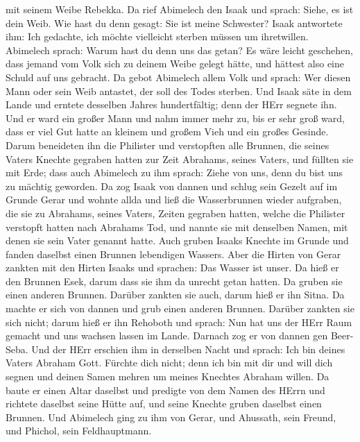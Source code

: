mit seinem Weibe Rebekka.  Da rief Abimelech den Isaak und
sprach: Siehe, es ist dein Weib. Wie hast du denn gesagt: Sie ist meine
Schwester? Isaak antwortete ihm: Ich gedachte, ich möchte vielleicht
sterben müssen um ihretwillen.  Abimelech sprach: Warum
hast du denn uns das getan? Es wäre leicht geschehen, dass jemand vom
Volk sich zu deinem Weibe gelegt hätte, und hättest also eine Schuld auf
uns gebracht.  Da gebot Abimelech allem Volk und sprach:
Wer diesen Mann oder sein Weib antastet, der soll des Todes sterben.
 Und Isaak säte in dem Lande und erntete desselben Jahres
hundertfältig; denn der HErr segnete ihn.  Und er ward ein
großer Mann und nahm immer mehr zu, bis er sehr groß ward, 
dass er viel Gut hatte an kleinem und großem Vieh und ein großes
Gesinde. Darum beneideten ihn die Philister  und
verstopften alle Brunnen, die seines Vaters Knechte gegraben hatten zur
Zeit Abrahams, seines Vaters, und füllten sie mit Erde; 
dass auch Abimelech zu ihm sprach: Ziehe von uns, denn du bist uns zu
mächtig geworden.  Da zog Isaak von dannen und schlug sein
Gezelt auf im Grunde Gerar und wohnte allda  und ließ die
Wasserbrunnen wieder aufgraben, die sie zu Abrahams, seines Vaters,
Zeiten gegraben hatten, welche die Philister verstopft hatten nach
Abrahams Tod, und nannte sie mit denselben Namen, mit denen sie sein
Vater genannt hatte.  Auch gruben Isaaks Knechte im Grunde
und fanden daselbst einen Brunnen lebendigen Wassers.  Aber
die Hirten von Gerar zankten mit den Hirten Isaaks und sprachen: Das
Wasser ist unser. Da hieß er den Brunnen Esek, darum dass sie ihm da
unrecht getan hatten.  Da gruben sie einen anderen Brunnen.
Darüber zankten sie auch, darum hieß er ihn Sitna.  Da
machte er sich von dannen und grub einen anderen Brunnen. Darüber
zankten sie sich nicht; darum hieß er ihn Rehoboth und sprach: Nun hat
uns der HErr Raum gemacht und uns wachsen lassen im Lande. 
Darnach zog er von dannen gen Beer-Seba.  Und der HErr
erschien ihm in derselben Nacht und sprach: Ich bin deines Vaters
Abraham Gott. Fürchte dich nicht; denn ich bin mit dir und will dich
segnen und deinen Samen mehren um meines Knechtes Abraham willen.
 Da baute er einen Altar daselbst und predigte von dem
Namen des HErrn und richtete daselbst seine Hütte auf, und seine Knechte
gruben daselbst einen Brunnen.  Und Abimelech ging zu ihm
von Gerar, und Ahussath, sein Freund, und Phichol, sein Feldhauptmann.
